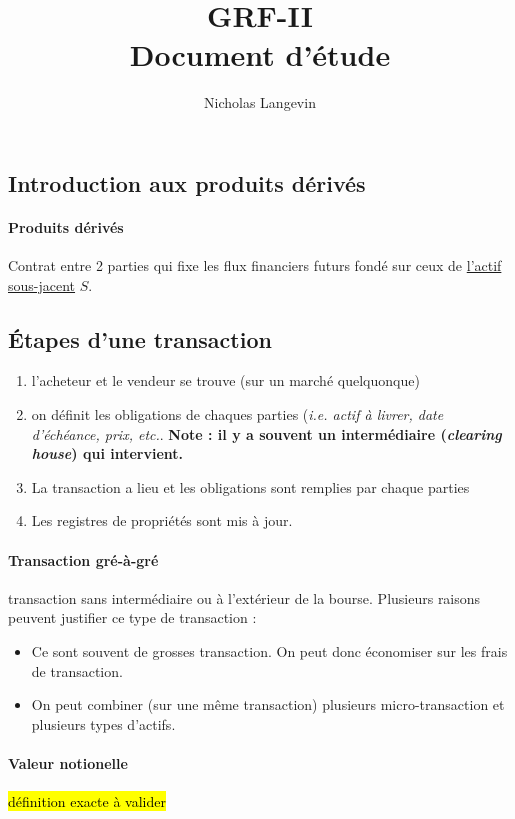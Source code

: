 \documentclass[10pt, french]{article}
\title{GRF-II \\ Document d'étude}
\author{Nicholas Langevin}
\begin{document}
% 

\small
\begin{multicols*}{2} %

\section{Introduction aux produits dérivés}
\paragraph{Produits dérivés} Contrat entre 2 parties qui fixe les flux financiers futurs fondé sur ceux de \underline{l'actif sous-jacent} $S$.

\subsection*{Étapes d'une transaction}
\begin{enumerate}
\item l'acheteur et le vendeur se trouve (sur un marché quelquonque)
\item on définit les obligations de chaques parties (\textit{i.e. actif à livrer, date d'échéance, prix, etc.}. \textbf{Note : il y a souvent un intermédiaire (\textit{clearing house}) qui intervient.}
\item La transaction a lieu et les obligations sont remplies par chaque parties
\item Les registres de propriétés sont mis à jour.
\end{enumerate}

\paragraph{Transaction gré-à-gré} transaction sans intermédiaire ou à l'extérieur de la bourse. Plusieurs raisons peuvent justifier ce type de transaction  :
\begin{itemize}
\item Ce sont souvent de grosses transaction. On peut donc économiser sur les frais de transaction.
\item On peut combiner (sur une même transaction) plusieurs micro-transaction et plusieurs types d'actifs.
\end{itemize}

\paragraph{Valeur notionelle} \hl{définition exacte à valider}


\end{multicols*}
\end{document}
